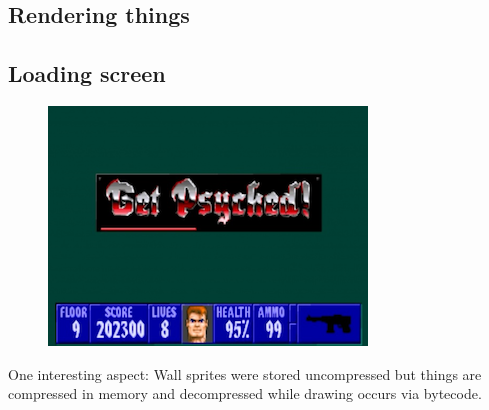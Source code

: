 \subsection{Rendering things}
\subsection{Loading screen}
 \begin{figure}[H]
\centering
 \includegraphics[scale=1.3]{imgs/get_psyched.png}

 \end{figure}
 
One interesting aspect: Wall sprites were stored uncompressed but things are compressed in memory and decompressed while drawing occurs via bytecode.
